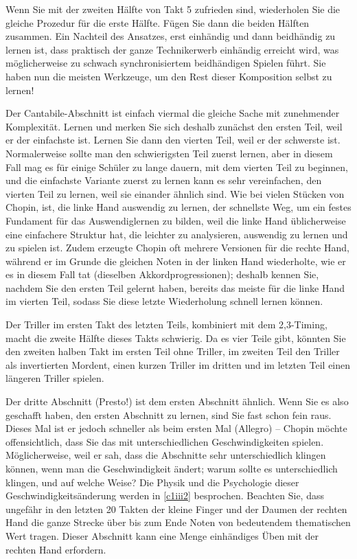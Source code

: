 Wenn Sie mit der zweiten Hälfte von Takt 5 zufrieden sind, wiederholen Sie die gleiche Prozedur für die erste Hälfte.
Fügen Sie dann die beiden Hälften zusammen.
Ein Nachteil des Ansatzes, erst einhändig und dann beidhändig zu lernen ist, dass praktisch der ganze Technikerwerb einhändig erreicht wird, was möglicherweise zu schwach synchronisiertem beidhändigen Spielen führt.
Sie haben nun die meisten Werkzeuge, um den Rest dieser Komposition selbst zu lernen!

Der Cantabile-Abschnitt ist einfach viermal die gleiche Sache mit zunehmender Komplexität.
Lernen und merken Sie sich deshalb zunächst den ersten Teil, weil er der einfachste ist.
Lernen Sie dann den vierten Teil, weil er der schwerste ist.
Normalerweise sollte man den schwierigsten Teil zuerst lernen, aber in diesem Fall mag es für einige Schüler zu lange dauern, mit dem vierten Teil zu beginnen, und die einfachste Variante zuerst zu lernen kann es sehr vereinfachen, den vierten Teil zu lernen, weil sie einander ähnlich sind.
Wie  bei vielen Stücken von Chopin, ist, die linke Hand auswendig zu lernen, der schnellste Weg, um ein festes Fundament für das Auswendiglernen zu bilden, weil die linke Hand üblicherweise eine einfachere Struktur hat, die leichter zu analysieren, auswendig zu lernen und zu spielen ist.
Zudem erzeugte Chopin oft mehrere Versionen für die rechte Hand, während er im Grunde die gleichen Noten in der linken Hand wiederholte, wie er es in diesem Fall tat (dieselben Akkordprogressionen);
deshalb kennen Sie, nachdem Sie den ersten Teil gelernt haben, bereits das meiste für die linke Hand im vierten Teil, sodass Sie diese letzte Wiederholung schnell lernen können.

Der Triller im ersten Takt des letzten Teils, kombiniert mit dem 2,3-Timing, macht die zweite Hälfte dieses Takts schwierig.
Da es vier Teile gibt, könnten Sie den zweiten halben Takt im ersten Teil ohne Triller, im zweiten Teil den Triller als invertierten Mordent, einen kurzen Triller im dritten und im letzten Teil einen längeren Triller spielen.

Der dritte Abschnitt (Presto!) ist dem ersten Abschnitt ähnlich.
Wenn Sie es also geschafft haben, den ersten Abschnitt zu lernen, sind Sie fast schon fein raus.
Dieses Mal ist er jedoch schneller als beim ersten Mal (Allegro) -- 
Chopin möchte offensichtlich, dass Sie das mit unterschiedlichen Geschwindigkeiten spielen.
Möglicherweise, weil er sah, dass die Abschnitte sehr unterschiedlich klingen können, wenn man die Geschwindigkeit ändert;
warum sollte es unterschiedlich klingen, und auf welche Weise?
Die Physik und die Psychologie dieser Geschwindigkeitsänderung werden in \hyperref[c1iii2]{\autoref{c1iii2}} besprochen.
Beachten Sie, dass ungefähr in den letzten 20 Takten der kleine Finger und der Daumen der rechten Hand die ganze Strecke über bis zum Ende Noten von bedeutendem thematischen Wert tragen.
Dieser Abschnitt kann eine Menge einhändiges Üben mit der rechten Hand erfordern.


